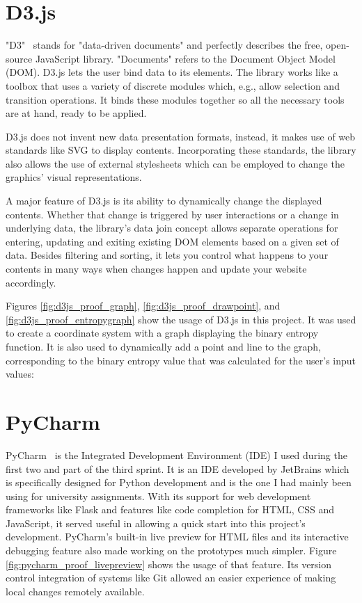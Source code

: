 \section{D3.js} \label{d3js}
"D3"~\cite{d3js_what_is_d3} stands for "data-driven documents" and perfectly describes the free, open-source JavaScript library. "Documents" refers to the Document Object Model (DOM). D3.js lets the user bind data to its elements. The library works like a toolbox that uses a variety of discrete modules which, e.g., allow selection and transition operations. It binds these modules together so all the necessary tools are at hand, ready to be applied.

D3.js does not invent new data presentation formats, instead, it makes use of web standards like SVG to display contents. Incorporating these standards, the library also allows the use of external stylesheets which can be employed to change the graphics' visual representations.

A major feature of D3.js is its ability to dynamically change the displayed contents. Whether that change is triggered by user interactions or a change in underlying data, the library's data join concept allows separate operations for entering, updating and exiting existing DOM elements based on a given set of data. Besides filtering and sorting, it lets you control what happens to your contents in many ways when changes happen and update your website accordingly.

Figures \ref{fig:d3js_proof_graph}, \ref{fig:d3js_proof_drawpoint}, and \ref{fig:d3js_proof_entropygraph} show the usage of D3.js in this project. It was used to create a coordinate system with a graph displaying the binary entropy function. It is also used to dynamically add a point and line to the graph, corresponding to the binary entropy value that was calculated for the user's input values:

\section{PyCharm} \label{pycharm}
PyCharm~\cite{pycharm} is the Integrated Development Environment (IDE) I used during the first two and part of the third sprint. It is an IDE developed by JetBrains which is specifically designed for Python development and is the one I had mainly been using for university assignments. With its support for web development frameworks like Flask and features like code completion for HTML, CSS and JavaScript, it served useful in allowing a quick start into this project's development.
PyCharm's built-in live preview for HTML files and its interactive debugging feature also made working on the prototypes much simpler. Figure \ref{fig:pycharm_proof_livepreview} shows the usage of that feature.
Its version control integration of systems like Git allowed an easier experience of making local changes remotely available.

